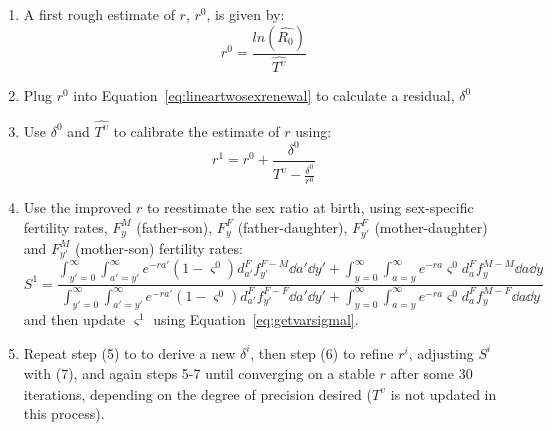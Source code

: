 \begin{enumerate}
  \item A first rough estimate of $r$, $r^0$, is given by:
   \begin{equation}
   r^0 = \frac{ln(\widehat{R_0})}{\widehat{T^\upsilon}}
   \end{equation}
  \item Plug $r^0$ into Equation~\ref{eq:lineartwosexrenewal} to calculate a
  residual, $\delta^0$
  \item Use $\delta^0$ and $\widehat{T^\upsilon}$ to calibrate the estimate of $r$
  using:
  \begin{equation}
  r^{1} = r^0 + \frac{\delta^0}{\widehat{T^\upsilon} - \frac{\delta^0}{r^0}}
  \end{equation}
  \item  Use the improved $r$ to reestimate the sex ratio at birth, using
  sex-specific fertility rates, $F_y^M$ (father-son), $F_y^F$
  (father-daughter), $F_{y'}^F$ (mother-daughter) and $F_{y'}^M$ (mother-son)
  fertility rates:
  \begin{equation}
  S^1 = \frac{ \int _{y'=0}^\infty \int _{a'=y'}^\infty e^{-ra'}
                      (1-\varsigma^0)d_{a'}^F f_{y'}^{F-M} \dd a' \dd y' + \int
                      _{y=0}^\infty \int _{a=y}^\infty e^{-ra}
                      \varsigma^0 d_{a}^F f_{y}^{M-M} \dd a \dd y}{\int
                      _{y'=0}^\infty \int _{a'=y'}^\infty e^{-ra'}
                      (1-\varsigma^0)d_{a'}^F f_{y'}^{F-F} \dd a' \dd y' + \int
                      _{y=0}^\infty \int _{a=y}^\infty e^{-ra} \varsigma^0
                      d_{a}^F f_{y}^{M-F} \dd a \dd y}
  \end{equation}
  and then update $\varsigma^1$ using Equation~\eqref{eq:getvarsigmal}.
  \item Repeat step (5) to to derive a new $\delta^i$, then step (6) to refine
  $r^i$, adjusting $S^i$ with (7), and again steps 5-7 until converging on a
  stable $r$ after some 30 iterations, depending on the degree of precision desired 
  ($\widehat{T^\upsilon}$ is not updated in this process).
\end{enumerate}
